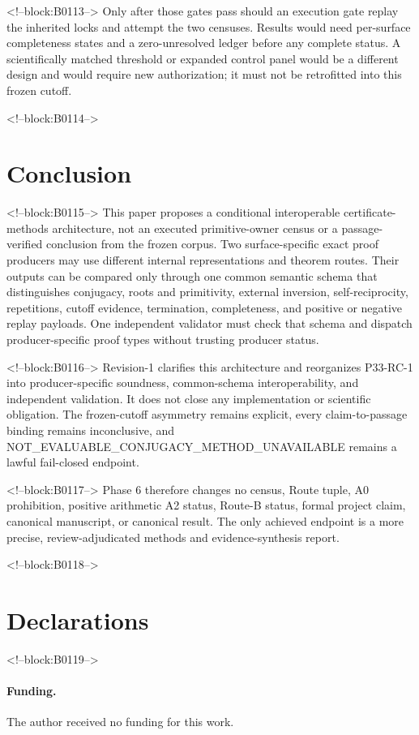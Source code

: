 \documentclass[11pt,a4paper]{article}
\begin{document}
<!--block:B0113-->
Only after those gates pass should an execution gate replay the inherited locks and attempt the two censuses. Results would need per-surface completeness states and a zero-unresolved ledger before any complete status. A scientifically matched threshold or expanded control panel would be a different design and would require new authorization; it must not be retrofitted into this frozen cutoff.

<!--block:B0114-->
\hypertarget{conclusion}{%
\section{Conclusion}\label{conclusion}}

<!--block:B0115-->
This paper proposes a conditional interoperable certificate-methods architecture, not an executed primitive-owner census or a passage-verified conclusion from the frozen corpus. Two surface-specific exact proof producers may use different internal representations and theorem routes. Their outputs can be compared only through one common semantic schema that distinguishes conjugacy, roots and primitivity, external inversion, self-reciprocity, repetitions, cutoff evidence, termination, completeness, and positive or negative replay payloads. One independent validator must check that schema and dispatch producer-specific proof types without trusting producer status.

<!--block:B0116-->
Revision-1 clarifies this architecture and reorganizes P33-RC-1 into producer-specific soundness, common-schema interoperability, and independent validation. It does not close any implementation or scientific obligation. The frozen-cutoff asymmetry remains explicit, every claim-to-passage binding remains inconclusive, and NOT\_EVALUABLE\_CONJUGACY\_METHOD\_UNAVAILABLE remains a lawful fail-closed endpoint.

<!--block:B0117-->
Phase 6 therefore changes no census, Route tuple, A0 prohibition, positive arithmetic A2 status, Route-B status, formal project claim, canonical manuscript, or canonical result. The only achieved endpoint is a more precise, review-adjudicated methods and evidence-synthesis report.

<!--block:B0118-->
\section*{Declarations}

<!--block:B0119-->
\paragraph{Funding.}
The author received no funding for this work.
\end{document}

